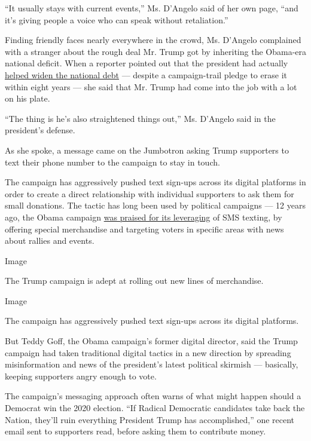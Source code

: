 ``It usually stays with current events,'' Ms. D'Angelo said of her own
page, ``and it's giving people a voice who can speak without
retaliation.''

Finding friendly faces nearly everywhere in the crowd, Ms. D'Angelo
complained with a stranger about the rough deal Mr. Trump got by
inheriting the Obama-era national deficit. When a reporter pointed out
that the president had actually
\href{https://www.businessinsider.com/national-debt-deficit-trump-how-it-compares-obama-bush-clinton-2019-11}{helped
widen the national debt} --- despite a campaign-trail pledge to erase it
within eight years --- she said that Mr. Trump had come into the job
with a lot on his plate.

``The thing is he's also straightened things out,'' Ms. D'Angelo said in
the president's defense.

As she spoke, a message came on the Jumbotron asking Trump supporters to
text their phone number to the campaign to stay in touch.

The campaign has aggressively pushed text sign-ups across its digital
platforms in order to create a direct relationship with individual
supporters to ask them for small donations. The tactic has long been
used by political campaigns --- 12 years ago, the Obama campaign
\href{https://adage.com/article/btob/lessons-sms-marketing-obama-campaign/273955}{was
praised for its leveraging} of SMS texting, by offering special
merchandise and targeting voters in specific areas with news about
rallies and events.

Image

The Trump campaign is adept at rolling out new lines of merchandise.

Image

The campaign has aggressively pushed text sign-ups across its digital
platforms.

But Teddy Goff, the Obama campaign's former digital director, said the
Trump campaign had taken traditional digital tactics in a new direction
by spreading misinformation and news of the president's latest political
skirmish --- basically, keeping supporters angry enough to vote.

The campaign's messaging approach often warns of what might happen
should a Democrat win the 2020 election. ``If Radical Democratic
candidates take back the Nation, they'll ruin everything President Trump
has accomplished,'' one recent email sent to supporters read, before
asking them to contribute money.

